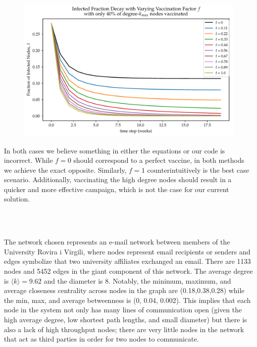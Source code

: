 \documentclass[11pt, oneside]{article}   	%
\newcommand{\prob}[2]{
\indent \\
\noindent{\color{green!50!blue}\bf {\large#1}}
{\normalfont #2}
}
\begin{document}
	\indent \prob{d)}{\vspace{-10mm}
	\begin{figure}[h!]
		\centering
		\includegraphics[width=15cm]{figs/changeinI_Vkmaxnodes.pdf}
		\label{changeI_kmaxnodes}\vspace{-4mm}
		\caption{}
	\end{figure}}
    \FloatBarrier
    In both cases we believe something in either the equations or our code is incorrect. While $f = 0$ should correspond to a perfect vaccine, in both
    methods we achieve the exact opposite. Similarly, $f=1$ counterintuitively is the best case scenario. Additionally, vaccinating the high degree nodes
    should result in a quicker and more effective campaign, which is not the case for our current solution.

\prob{4 {\it the voter model}}{}

	\indent \prob{a)}{The network chosen represents an e-mail network between members of the University Rovira i Virgili,
                      where nodes represent email recipients or senders and edges symbolize that two university affiliates
                      exchanged an email. There are 1133 nodes and 5452 edges in the giant component of this network.
                      The average degree is $\langle k \rangle = 9.62$ and the diameter is $8$. 
                      Notably, the minimum, maximum, and average closeness centrality 
                      across nodes in the graph are (0.18,0.38,0.28) while the min, max, and average betweenness is (0, 0.04, 0.002). This
                      implies that each node in the system not only has many lines of communication open (given the high average degree, 
                      low shortest path lengths, and small diameter) but there is also a lack of high throughput nodes; there are very little
                      nodes in the network that act as third parties in order for two nodes to communicate.}
\end{document}
